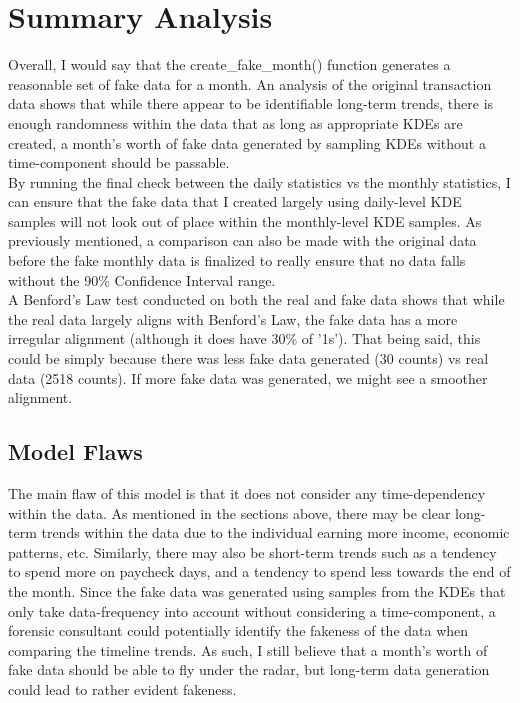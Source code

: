 \documentclass[11pt]{article}
\begin{document}
    \begin{center}
    \end{center}
    
   \section{ Summary Analysis}

Overall, I would say that the create\_fake\_month() function generates a
reasonable set of fake data for a month. An analysis of the original
transaction data shows that while there appear to be identifiable
long-term trends, there is enough randomness within the data that as
long as appropriate KDEs are created, a month's worth of fake data
generated by sampling KDEs without a time-component should be passable.\\

By running the final check between the daily statistics vs the monthly
statistics, I can ensure that the fake data that I created largely using
daily-level KDE samples will not look out of place within the
monthly-level KDE samples. As previously mentioned, a comparison can
also be made with the original data before the fake monthly data is
finalized to really ensure that no data falls without the 90\%
Confidence Interval range.\\

A Benford's Law test conducted on both the real and fake data shows that
while the real data largely aligns with Benford's Law, the fake data has
a more irregular alignment (although it does have 30\% of '1s'). That
being said, this could be simply because there was less fake data
generated (30 counts) vs real data (2518 counts). If more fake data was
generated, we might see a smoother alignment.
\newpage
\subsection{Model Flaws}

The main flaw of this model is that it does not consider any
time-dependency within the data. As mentioned in the sections above,
there may be clear long-term trends within the data due to the
individual earning more income, economic patterns, etc. Similarly, there
may also be short-term trends such as a tendency to spend more on
paycheck days, and a tendency to spend less towards the end of the
month. Since the fake data was generated using samples from the KDEs
that only take data-frequency into account without considering a
time-component, a forensic consultant could potentially identify the
fakeness of the data when comparing the timeline trends. As such, I
still believe that a month's worth of fake data should be able to fly
under the radar, but long-term data generation could lead to rather
evident fakeness.\\
\end{document}
